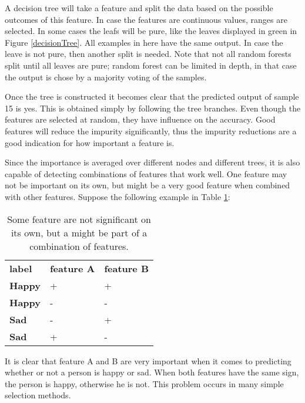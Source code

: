 \npar
A decision tree will take a feature and split the data based on the possible outcomes of this feature. In case the features are continuous values, ranges are selected. In some cases the leafs will be pure, like the leaves displayed in  green in Figure \ref{decisionTree}. All examples in here have the same output. In case the leave is not pure, then another split is needed. Note that not all random forests split until all leaves are pure; random forest can be limited in depth, in that case the output is chose by a majority voting of the samples.


Once the tree is constructed it becomes clear that the predicted output of sample 15 is yes. This is obtained simply by following the tree branches. Even though the features are selected at random, they have influence on the accuracy. Good features will reduce the impurity significantly, thus the impurity reductions are a good indication for how important a feature is.

\npar

Since the importance is averaged over different nodes and different trees, it is also capable of detecting combinations of features that work well. One feature may not be important on its own, but might be a very good feature when combined with other features. Suppose the following example in Table \ref{featPair}:

\begin{table}[H]
\centering
\begin{tabular}{lll}
\textbf{label} & \textbf{feature A} & \textbf{feature B} \\
\textbf{Happy} & +                  & +                  \\
\textbf{Happy} & -                  & -                  \\
\textbf{Sad}   & -                  & +                  \\
\textbf{Sad}   & +                  & -                 
\end{tabular}
\caption{Some feature are not significant on its own, but a might be part of a combination of features.\label{featPair}}
\end{table}

It is clear that feature A and B are very important when it comes to predicting whether or not a person is happy or sad. When both features have the same sign, the person is happy, otherwise he is not. This problem occurs in many simple selection methods. 

